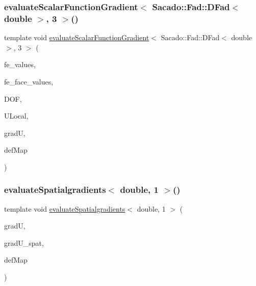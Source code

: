 \subsubsection{\texorpdfstring{evaluate\+Scalar\+Function\+Gradient$<$ Sacado\+::\+Fad\+::\+D\+Fad$<$ double $>$, 3 $>$()}{evaluateScalarFunctionGradient< Sacado::Fad::DFad< double >, 3 >()}\hspace{0.1cm}{\footnotesize\ttfamily [4/4]}}
{\footnotesize\ttfamily template void \mbox{\hyperlink{group___evaluation_functions_gabedd4ae2841d2332ed0df0513b189e34}{evaluate\+Scalar\+Function\+Gradient}}$<$ Sacado\+::\+Fad\+::\+D\+Fad$<$ double $>$, 3 $>$ (\begin{DoxyParamCaption}\item[{const F\+E\+Values$<$ 3 $>$ \&}]{fe\+\_\+values,  }\item[{const F\+E\+Face\+Values$<$ 3 $>$ \&}]{fe\+\_\+face\+\_\+values,  }\item[{unsigned int}]{D\+OF,  }\item[{Table$<$ 1, Sacado\+::\+Fad\+::\+D\+Fad$<$ double $>$$>$ \&}]{U\+Local,  }\item[{Table$<$ 2, Sacado\+::\+Fad\+::\+D\+Fad$<$ double $>$$>$ \&}]{gradU,  }\item[{\mbox{\hyperlink{structdeformation_map}{deformation\+Map}}$<$ Sacado\+::\+Fad\+::\+D\+Fad$<$ double $>$, 3 $>$ \&}]{def\+Map }\end{DoxyParamCaption})}

\mbox{\label{function_evaluations_8cc_a629c7bb265581b5853dbfb9af43c4a0a}} 
\subsubsection{\texorpdfstring{evaluate\+Spatialgradients$<$ double, 1 $>$()}{evaluateSpatialgradients< double, 1 >()}\hspace{0.1cm}{\footnotesize\ttfamily [1/2]}}
{\footnotesize\ttfamily template void \mbox{\hyperlink{group___evaluation_functions_ga0b976342d491f6215953e2e65ea6a0de}{evaluate\+Spatialgradients}}$<$ double, 1 $>$ (\begin{DoxyParamCaption}\item[{Table$<$ 2, double $>$ \&}]{gradU,  }\item[{Table$<$ 2, double $>$}]{grad\+U\+\_\+spat,  }\item[{\mbox{\hyperlink{structdeformation_map}{deformation\+Map}}$<$ double, 1 $>$ \&}]{def\+Map }\end{DoxyParamCaption})}


